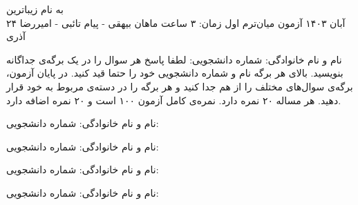 
\usepackage{assets/template}
\newcommand{\hidesolutions}{}


{\centering به نام زیباترین}\\

	\header
		{۲۴ آبان ۱۴۰۳}
		{آزمون میان‌ترم اول}
		{زمان: ۳ ساعت}
		{ماهان بیهقی - پیام تائبی - امیررضا آذری}{}
	
\vspace{-3mm}
نام و نام خانوادگی: \hspace{8cm} شماره دانشجویی:
\hline
\vspace{2mm}
لطفا پاسخ هر سوال را در یک برگه‌ی جداگانه بنویسید. بالای هر برگه نام و شماره‌ دانشجویی خود را حتما قید کنید. در پایان آزمون، برگه‌ی سوال‌های مختلف را از هم جدا کنید و هر برگه را در دسته‌ی مربوط به خود قرار دهید.
هر مساله ۲۰ نمره دارد. نمره‌ی کامل آزمون ۱۰۰ است و  ۲۰ نمره اضافه دارد.

\vspace{0.5cm}

\pagebreak
\hline
نام و نام خانوادگی: \hspace{8cm} شماره دانشجویی:
\hline
\vspace{0.5cm}

\pagebreak
\hline
نام و نام خانوادگی: \hspace{8cm} شماره دانشجویی:
\hline
\vspace{0.5cm}

\pagebreak
\hline
\hline
\vspace{0.5cm}

\pagebreak
\hline
نام و نام خانوادگی: \hspace{8cm} شماره دانشجویی:
\hline
\vspace{0.5cm}

\pagebreak
\hline
نام و نام خانوادگی: \hspace{8cm} شماره دانشجویی:
\hline
\vspace{0.5cm}


